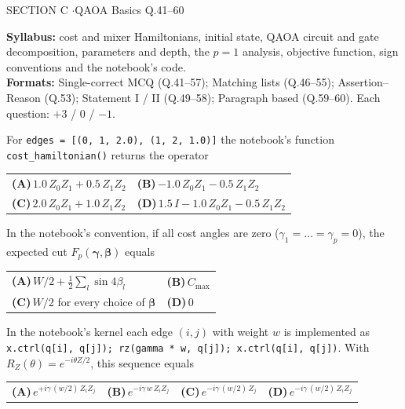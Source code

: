 \documentclass[11pt,a4paper]{article}
\newcommand{\optlabel}[1]{\textbf{(#1)}}
\newenvironment{qitem}[1]{\begin{list}{}{\setlength{\leftmargin}{3.3em}\setlength{\labelwidth}{3.1em}%
  \setlength{\labelsep}{0.2em}\setlength{\topsep}{3pt}\setlength{\parsep}{3pt}}\item[\textbf{Q.#1}\hfill]}{\end{list}}
\newcommand{\qsep}{\par\vspace{2pt}{\color{black!15}\hrule}\vspace{4pt}}
\begin{document}
\newpage

\begin{sectionbanner}SECTION C \enspace$\cdot$\enspace QAOA Basics \hfill Q.41--60\end{sectionbanner}

{\small \textbf{Syllabus:} cost and mixer Hamiltonians, initial state, QAOA circuit and gate decomposition, parameters and depth, the $p = 1$ analysis, objective function, sign conventions and the notebook's code.\\ \textbf{Formats:} Single-correct MCQ (Q.41--57); Matching lists (Q.46--55); Assertion--Reason (Q.53); Statement I / II (Q.49--58); Paragraph based (Q.59--60). Each question: $+3$ / $0$ / $-1$.}
\par\medskip

\begin{qitem}{41}
For \texttt{edges = [(0, 1, 2.0), (1, 2, 1.0)]} the notebook's function \texttt{cost\_hamiltonian()} returns the operator
\par\smallskip\noindent\begin{tabularx}{\linewidth}{@{}*{2}{L}@{}}
\optlabel{A}\,$1.0\,Z_0Z_1 + 0.5\,Z_1Z_2$ & \optlabel{B}\,$-1.0\,Z_0Z_1 - 0.5\,Z_1Z_2$ \\[3pt]
\optlabel{C}\,$2.0\,Z_0Z_1 + 1.0\,Z_1Z_2$ & \optlabel{D}\,$1.5\,I - 1.0\,Z_0Z_1 - 0.5\,Z_1Z_2$
\end{tabularx}
\end{qitem}
\qsep

\begin{qitem}{42}
In the notebook's convention, if all cost angles are zero ($\gamma_1 = \dots = \gamma_p = 0$), the expected cut
$F_p(\boldsymbol\gamma, \boldsymbol\beta)$ equals
\par\smallskip\noindent\begin{tabularx}{\linewidth}{@{}*{2}{L}@{}}
\optlabel{A}\,$W/2 + \tfrac12\sum_l \sin 4\beta_l$ & \optlabel{B}\,$C_{\max}$ \\[3pt]
\optlabel{C}\,$W/2$ for every choice of $\boldsymbol\beta$ & \optlabel{D}\,$0$
\end{tabularx}
\end{qitem}
\qsep

\begin{qitem}{43}
In the notebook's kernel each edge $(i, j)$ with weight $w$ is implemented as
\texttt{x.ctrl(q[i], q[j]); rz(gamma * w, q[j]); x.ctrl(q[i], q[j])}. With $R_Z(\theta) = e^{-i\theta Z/2}$, this sequence equals
\par\smallskip\noindent\begin{tabularx}{\linewidth}{@{}*{4}{L}@{}}
\optlabel{A}\,$e^{+i\gamma\,(w/2)\,Z_iZ_j}$ & \optlabel{B}\,$e^{-i\gamma\, w\, Z_iZ_j}$ & \optlabel{C}\,$e^{-i\gamma\,(w/2)\,Z_j}$ & \optlabel{D}\,$e^{-i\gamma\,(w/2)\,Z_iZ_j}$
\end{tabularx}
\end{qitem}
\qsep
\end{document}
